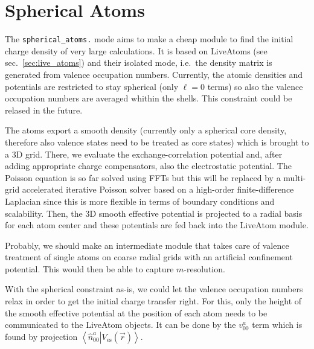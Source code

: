 \documentclass[oribibl]{llncs}
\newcommand{\um}[1]{_{\mathrm{#1}}}
\newcommand{\ttt}[1]{\texttt{#1}}
\newcommand{\braket}[2]{\left\langle \left. #1 \right| #2 \right\rangle}
\begin{document}
\section{Spherical Atoms}\label{sec:spherial-atoms}
%
The \ttt{spherical\_atoms.} mode aims to
make a cheap module to find the initial
charge density of very large calculations.
It is based on LiveAtoms (see sec.~\ref{sec:live_atoms})
and their isolated mode, i.e.~the density matrix is generated from valence occupation numbers.
Currently, the atomic densities and potentials are restricted to
stay spherical (only $\ell = 0$ terms) so
also the valence occupation numbers are averaged whithin the shells.
This constraint could be relased in the future.

The atoms export a smooth density (currently only a spherical core density, 
therefore also valence states need to be treated as core states)
which is brought to a 3D grid.
There, we evaluate the exchange-correlation potential and, after adding 
appropriate charge compensators, also the electrostatic potential.
The Poisson equation is so far solved using FFTs but this will be
replaced by a multi-grid accelerated iterative Poisson solver based on a
high-order finite-difference Laplacian since this is more flexible
in terms of boundary conditions and scalability.
Then, the 3D smooth effective potential is projected to a radial basis
for each atom center and these potentials are fed back into the LiveAtom module.

Probably, we should make an intermediate module that takes care of
valence treatment of single atoms on coarse radial grids with an artificial confinement potential.
This would then be able to capture $m$-resolution.

With the spherical constraint as-is,
we could let the valence occupation numbers relax 
in order to get the initial charge transfer right.
For this, only the height of the smooth effective potential at
the position of each atom needs to be communicated to the LiveAtom objects.
It can be done by the $v^a_{00}$ term which is found by projection 
$\braket{\hat n^a_{00}}{V\um{es}(\vec r)}$.
\end{document}
